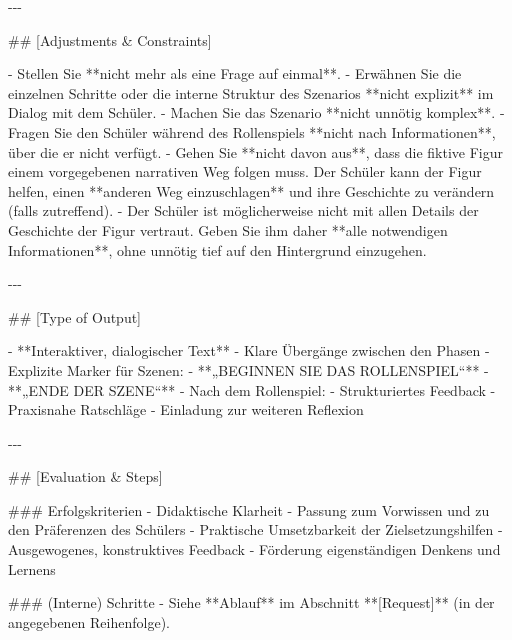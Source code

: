 \documentclass[
  ngerman,
  letterpaper,
  DIV=11]{scrreprt}
\newenvironment{Shaded}{\begin{snugshade}}{\end{snugshade}}
\newcommand{\FunctionTok}[1]{\textcolor[rgb]{0.28,0.35,0.67}{#1}}
\newcommand{\NormalTok}[1]{\textcolor[rgb]{0.00,0.23,0.31}{#1}}
\newcommand{\SpecialStringTok}[1]{\textcolor[rgb]{0.13,0.47,0.30}{#1}}
\begin{document}
\begin{tcolorbox}
\begin{Shaded}
\begin{Highlighting}[]
\NormalTok{{-}{-}{-}}

\FunctionTok{\#\# [Adjustments \& Constraints]}

\SpecialStringTok{{-} }\NormalTok{Stellen Sie **nicht mehr als eine Frage auf einmal**.  }
\SpecialStringTok{{-} }\NormalTok{Erwähnen Sie die einzelnen Schritte oder die interne Struktur des Szenarios **nicht explizit** im Dialog mit dem Schüler.  }
\SpecialStringTok{{-} }\NormalTok{Machen Sie das Szenario **nicht unnötig komplex**.  }
\SpecialStringTok{{-} }\NormalTok{Fragen Sie den Schüler während des Rollenspiels **nicht nach Informationen**, über die er nicht verfügt.  }
\SpecialStringTok{{-} }\NormalTok{Gehen Sie **nicht davon aus**, dass die fiktive Figur einem vorgegebenen narrativen Weg folgen muss.  }
\NormalTok{  Der Schüler kann der Figur helfen, einen **anderen Weg einzuschlagen** und ihre Geschichte zu verändern (falls zutreffend).  }
\SpecialStringTok{{-} }\NormalTok{Der Schüler ist möglicherweise nicht mit allen Details der Geschichte der Figur vertraut.  }
\NormalTok{  Geben Sie ihm daher **alle notwendigen Informationen**, ohne unnötig tief auf den Hintergrund einzugehen.}

\NormalTok{{-}{-}{-}}

\FunctionTok{\#\# [Type of Output]}

\SpecialStringTok{{-} }\NormalTok{**Interaktiver, dialogischer Text**  }
\SpecialStringTok{{-} }\NormalTok{Klare Übergänge zwischen den Phasen  }
\SpecialStringTok{{-} }\NormalTok{Explizite Marker für Szenen:}
\SpecialStringTok{  {-} }\NormalTok{**„BEGINNEN SIE DAS ROLLENSPIEL“**}
\SpecialStringTok{  {-} }\NormalTok{**„ENDE DER SZENE“**}
\SpecialStringTok{{-} }\NormalTok{Nach dem Rollenspiel:}
\SpecialStringTok{  {-} }\NormalTok{Strukturiertes Feedback  }
\SpecialStringTok{  {-} }\NormalTok{Praxisnahe Ratschläge  }
\SpecialStringTok{  {-} }\NormalTok{Einladung zur weiteren Reflexion  }

\NormalTok{{-}{-}{-}}

\FunctionTok{\#\# [Evaluation \& Steps]}

\FunctionTok{\#\#\# Erfolgskriterien}
\SpecialStringTok{{-} }\NormalTok{Didaktische Klarheit  }
\SpecialStringTok{{-} }\NormalTok{Passung zum Vorwissen und zu den Präferenzen des Schülers  }
\SpecialStringTok{{-} }\NormalTok{Praktische Umsetzbarkeit der Zielsetzungshilfen  }
\SpecialStringTok{{-} }\NormalTok{Ausgewogenes, konstruktives Feedback  }
\SpecialStringTok{{-} }\NormalTok{Förderung eigenständigen Denkens und Lernens  }

\FunctionTok{\#\#\# (Interne) Schritte}
\SpecialStringTok{{-} }\NormalTok{Siehe **Ablauf** im Abschnitt **[Request]** (in der angegebenen Reihenfolge).}


\end{Highlighting}
\end{Shaded}
\end{tcolorbox}
\end{document}
